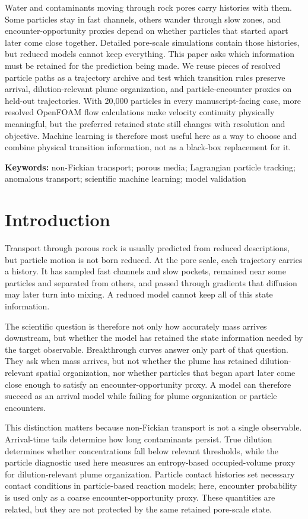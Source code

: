 \documentclass[11pt]{article}
\begin{document}
Water and contaminants moving through rock pores carry histories with them. Some particles stay in fast channels, others wander through slow zones, and encounter-opportunity proxies depend on whether particles that started apart later come close together. Detailed pore-scale simulations contain those histories, but reduced models cannot keep everything. This paper asks which information must be retained for the prediction being made. We reuse pieces of resolved particle paths as a trajectory archive and test which transition rules preserve arrival, dilution-relevant plume organization, and particle-encounter proxies on held-out trajectories. With 20,000 particles in every manuscript-facing case, more resolved OpenFOAM flow calculations make velocity continuity physically meaningful, but the preferred retained state still changes with resolution and objective. Machine learning is therefore most useful here as a way to choose and combine physical transition information, not as a black-box replacement for it.

\noindent\textbf{Keywords:} non-Fickian transport; porous media; Lagrangian particle tracking; anomalous transport; scientific machine learning; model validation

\section{Introduction}

Transport through porous rock is usually predicted from reduced descriptions, but particle motion is not born reduced. At the pore scale, each trajectory carries a history. It has sampled fast channels and slow pockets, remained near some particles and separated from others, and passed through gradients that diffusion may later turn into mixing. A reduced model cannot keep all of this state information.

The scientific question is therefore not only how accurately mass arrives downstream, but whether the model has retained the state information needed by the target observable. Breakthrough curves answer only part of that question. They ask when mass arrives, but not whether the plume has retained dilution-relevant spatial organization, nor whether particles that began apart later come close enough to satisfy an encounter-opportunity proxy. A model can therefore succeed as an arrival model while failing for plume organization or particle encounters.

This distinction matters because non-Fickian transport is not a single observable. Arrival-time tails determine how long contaminants persist. True dilution determines whether concentrations fall below relevant thresholds, while the particle diagnostic used here measures an entropy-based occupied-volume proxy for dilution-relevant plume organization. Particle contact histories set necessary contact conditions in particle-based reaction models; here, encounter probability is used only as a coarse encounter-opportunity proxy. These quantities are related, but they are not protected by the same retained pore-scale state.
\end{document}
